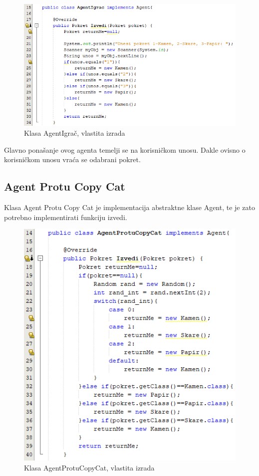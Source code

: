 \documentclass{foi}
\begin{document}
\begin{figure}[h!]
    \centering
    \includegraphics[scale=0.9]{slike/Screenshot_6.png}
    \caption{Klasa AgentIgrač, vlastita izrada}
\end{figure}

Glavno ponašanje ovog agenta temelji se na korisničkom unosu. Dakle ovisno o korisničkom unosu vraća se odabrani pokret.

\clearpage

\subsection{Agent Protu Copy Cat}
Klasa Agent Protu Copy Cat je implementacija abstraktne klase Agent, te je zato potrebno implementirati funkciju izvedi.
\begin{figure}[h!]
    \centering
    \includegraphics[scale=0.9]{slike/Screenshot_7.png}
    \caption{Klasa AgentProtuCopyCat, vlastita izrada}
\end{figure}
\end{document}
